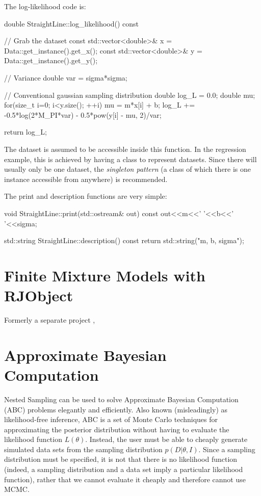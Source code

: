 \documentclass[article]{jss}
\begin{document}
The log-likelihood code is:
\begin{CodeChunk}
\begin{CodeInput}
double StraightLine::log_likelihood() const
{
    // Grab the dataset
    const std::vector<double>& x = Data::get_instance().get_x();
    const std::vector<double>& y = Data::get_instance().get_y();

    // Variance
    double var = sigma*sigma;

    // Conventional gaussian sampling distribution
    double log_L = 0.0;
    double mu;
    for(size_t i=0; i<y.size(); ++i)
    {
        mu = m*x[i] + b;
        log_L += -0.5*log(2*M_PI*var) - 0.5*pow(y[i] - mu, 2)/var;
    }

    return log_L;
}
\end{CodeInput}
\end{CodeChunk}
The dataset is assumed to be accessible inside this function. In the
regression example, this is achieved by having a
 class to represent
datasets. Since there will usually only be one dataset,
the {\em singleton pattern} (a class of which there is one instance
accessible from anywhere) is recommended.

The print and description functions are very simple:
\begin{CodeChunk}
\begin{CodeInput}
void StraightLine::print(std::ostream& out) const
{
    out<<m<<' '<<b<<' '<<sigma;
}

std::string StraightLine::description() const
{
    return std::string("m, b, sigma");
}

\end{CodeInput}
\end{CodeChunk}

\section{Finite Mixture Models with RJObject}
Formerly a separate project \citep{rjobject}, 

\section{Approximate Bayesian Computation}
Nested Sampling can be used to solve Approximate Bayesian Computation (ABC)
problems elegantly and efficiently.
Also known (misleadingly) as likelihood-free inference,
ABC
is a set of Monte Carlo techniques for approximating the posterior distribution
without having to evaluate the likelihood function $L(\theta)$. Instead, 
the user must be able to cheaply
generate simulated data sets from the sampling distribution $p(D|\theta, I)$.
Since a sampling distribution must be specified, it is not that there is
no likelihood function (indeed, a sampling distribution and
a data set imply a particular likelihood function), rather that we cannot
evaluate it cheaply and therefore cannot use MCMC.
\end{document}
